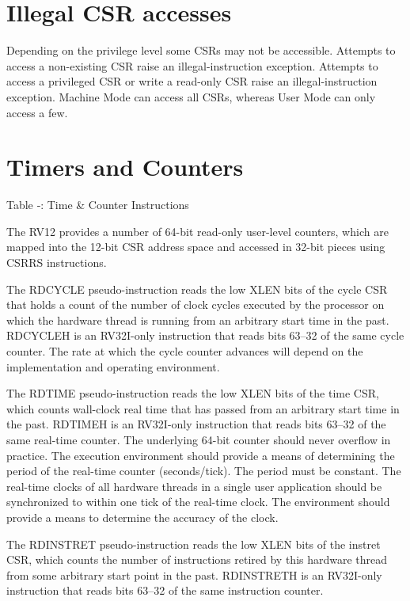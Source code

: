 \section{Illegal CSR accesses}\label{illegal-csr-accesses}

Depending on the privilege level some CSRs may not be accessible.
Attempts to access a non-existing CSR raise an illegal-instruction
exception. Attempts to access a privileged CSR or write a read-only CSR
raise an illegal-instruction exception. Machine Mode can access all
CSRs, whereas User Mode can only access a
few.\protect\hypertarget{_Toc326677756}{}{}

\section{Timers and Counters}\label{timers-and-counters}

\missingfigure{}

Table ‑: Time \& Counter Instructions

The RV12 provides a number of 64-bit read-only user-level counters,
which are mapped into the 12-bit CSR address space and accessed in
32-bit pieces using CSRRS instructions.

The RDCYCLE pseudo-instruction reads the low XLEN bits of the cycle CSR
that holds a count of the number of clock cycles executed by the
processor on which the hardware thread is running from an arbitrary
start time in the past. RDCYCLEH is an RV32I-only instruction that reads
bits 63--32 of the same cycle counter. The rate at which the cycle
counter advances will depend on the implementation and operating
environment.

The RDTIME pseudo-instruction reads the low XLEN bits of the time CSR,
which counts wall-clock real time that has passed from an arbitrary
start time in the past. RDTIMEH is an RV32I-only instruction that reads
bits 63--32 of the same real-time counter. The underlying 64-bit counter
should never overflow in practice. The execution environment should
provide a means of determining the period of the real-time counter
(seconds/tick). The period must be constant. The real-time clocks of all
hardware threads in a single user application should be synchronized to
within one tick of the real-time clock. The environment should provide a
means to determine the accuracy of the clock.

The RDINSTRET pseudo-instruction reads the low XLEN bits of the instret
CSR, which counts the number of instructions retired by this hardware
thread from some arbitrary start point in the past. RDINSTRETH is an
RV32I-only instruction that reads bits 63--32 of the same instruction
counter.

